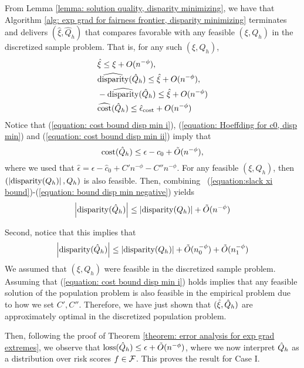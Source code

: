 \documentclass{article}
\begin{document}
From Lemma \ref{lemma: solution quality, disparity minimizing}, we have that Algorithm \ref{alg: exp grad for fairness frontier, disparity minimizing} terminates and delivers $(\hat \xi, \hat Q_h)$ that compares favorable with any feasible $(\xi, Q_h)$ in the discretized sample problem. That is, for any such $(\xi, Q_h)$,
            \begin{align}
                & \hat{\xi} \leq \xi + O(n^{-\phi}), \label{equation:slack xi bound} \\ 
                & \widehat{\operatorname{disparity}}(\hat{Q}_h) \leq \hat \xi + O(n^{-\phi}), \\
                & -\widehat{\operatorname{disparity}}(\hat{Q}_h) \leq \hat \xi + O(n^{-\phi})  \label{equation: bound disp min negative} \\ 
                & \widehat{\operatorname{cost}}(\hat{Q}_h) \leq \hat{\epsilon}_{\operatorname{cost}} + O(n^{-\phi}) \label{equation: cost bound disp min ii}
            \end{align}
Notice that (\ref{equation: cost bound disp min i}), (\ref{equation: Hoeffding for c0, disp min}) and (\ref{equation: cost bound disp min ii}) imply that 
            \begin{equation}
                \operatorname{cost}(\hat{Q}_h) \leq \epsilon - c_0 + \tilde{O}(n^{-\phi}),
            \end{equation}
where we used that $\hat{\epsilon} = \epsilon - \hat{c}_0 + C' n^{-\phi} - C'' n^{-\phi}$. For any feasible $(\xi, Q_h)$, then $( \left|\operatorname{disparity}(Q_h) \right|, Q_h)$ is also feasible. Then, combining ~(\ref{equation:slack xi bound})-(\ref{equation: bound disp min negative}) yields
\begin{equation}
    \left|\operatorname{disparity}(\hat{Q}_h) \right| \leq \left|\operatorname{disparity}(Q_h) \right| + \tilde{O}(n^{-\phi})
\end{equation}

Second, notice that this implies that 
    \begin{equation}
        \left|\operatorname{disparity}(\hat{Q}_h) \right| \leq \left|\operatorname{disparity}(Q_h) \right| + \tilde{O}(n_0^{-\phi}) + \tilde{O}(n_1^{-\phi})
    \end{equation}
We assumed that $(\xi, Q_h)$ were feasible in the discretized sample problem. Assuming that (\ref{equation: cost bound disp min i}) holds implies that any feasible solution of the population problem is also feasible in the empirical problem due to how we set $C', C''$. Therefore, we have just shown that $(\hat \xi, \hat{Q}_h)$ are approximately optimal in the discretized population problem. 
        
Then, following the proof of Theorem \ref{theorem: error analysis for exp grad extremes}, we observe that $\operatorname{loss}(\hat{Q}_h) \leq \epsilon + \tilde{O}(n^{-\phi})$, where we now interpret $\hat{Q}_h$ as a distribution over risk scores $f \in \mathcal{F}$. This proves the result for Case I.
        
\end{document}
